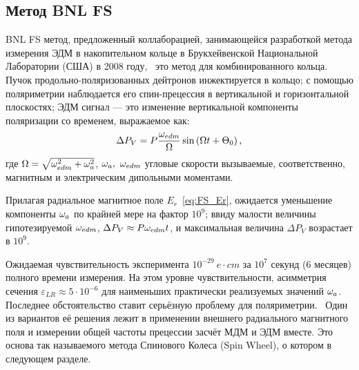 
\subsection{Метод BNL FS}
BNL FS метод, предложенный коллаборацией, занимающейся разработкой
метода измерения ЭДМ в накопительном кольце в Брукхейвенской
Национальной Лаборатории (США) в 2008 году,~\cite{BNL:Deuteron2008}
это метод для комбинированного кольца. Пучок продольно-поляризованных
дейтронов инжектируется в кольцо; с помощью поляриметрии наблюдается
его спин-прецессия в вертикальной и горизонтальной плоскостях; ЭДМ
сигнал --- это изменение вертикальной компоненты поляризации со
временем, выражаемое как:~\cite[стр.~8]{BNL:Deuteron2008}
\begin{equation}
  \Delta P_V = P\frac{\w_{edm}}{\W}\sin\bkt{\W t + \Theta_0},
\end{equation}
где $\Omega = \sqrt{\omega_{edm}^2 + \omega_a^2}$, $\omega_a,~\omega_{edm}$ угловые
скорости вызываемые, соответственно, магнитным и электрическим
дипольными моментами.

Прилагая радиальное магнитное поле $E_r$~\eqref{eq:FS_Er}, ожидается
уменьшение компоненты $\omega_a$ по крайней мере на фактор $10^9$; ввиду
малости величины гипотезируемой $\omega_{edm}$, $\Delta P_V \approx P
\omega_{edm} t$, и максимальная величина $\Delta P_V$ возрастает в $10^9$.

Ожидаемая чувствительность эксперимента $10^{-29}~e\cdot cm$ за $10^7$
секунд (6 месяцев) полного времени измерения. На этом уровне
чувствительности, асимметрия сечения $\varepsilon_{LR} \approx 5\cdot
10^{-6}$ для наименьших практически реализуемых значений
$\omega_a$.~\cite[стр.~18]{BNL:Deuteron2008} Последнее обстоятельство
ставит серьёзную проблему для поляриметрии.~\cite{Mane:SpinWheel} Один
из вариантов её решения лежит в применении внешнего радиального
магнитного поля и измерении общей частоты прецессии засчёт МДМ и ЭДМ
вместе. Это основа так называемого метода Спинового Колеса (Spin Wheel), о котором в
следующем разделе. 

